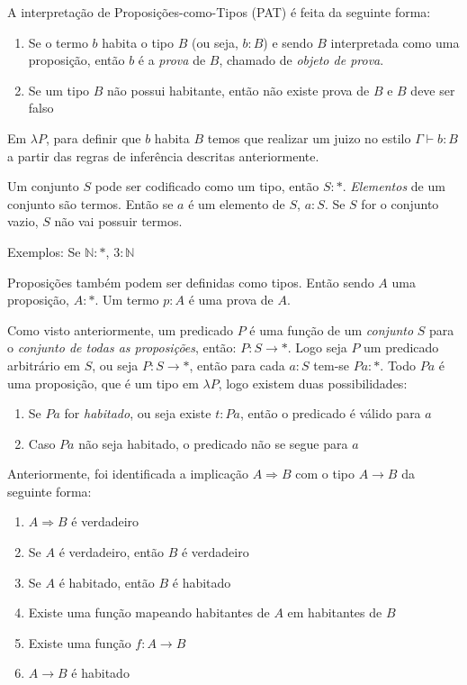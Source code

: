 \documentclass[../main.tex]{subfiles}
\begin{document}
A interpretação de Proposições-como-Tipos (PAT) é feita da seguinte forma:

\begin{enumerate}[label=-]
    \item Se o termo $b$ habita o tipo $B$ (ou seja, $b : B$) e sendo $B$ interpretada como uma proposição, então $b$ é a \emph{prova} de $B$, chamado de \emph{objeto de prova}.
    \item Se um tipo $B$ não possui habitante, então não existe prova de $B$ e $B$ deve ser falso
\end{enumerate}

Em $\lambda P$, para definir que $b$ habita $B$ temos que realizar um juizo no estilo $\Gamma \vdash b : B$ a partir das regras de inferência descritas anteriormente.

Um conjunto $S$ pode ser codificado como um tipo, então $S : \ast$. \emph{Elementos} de um conjunto são termos. Então se $a$ é um elemento de $S$, $a : S$. Se $S$ for o conjunto vazio, $S$ não vai possuir termos.

Exemplos: Se $\mathbb{N} : \ast$, $3 : \mathbb{N}$

Proposições também podem ser definidas como tipos. Então sendo $A$ uma proposição, $A : \ast$. Um termo $p : A$ é uma prova de $A$.

Como visto anteriormente, um predicado $P$ é uma função de um \emph{conjunto} $S$ para o \emph{conjunto de todas as proposições}, então: $P : S \to \ast$. Logo seja $P$ um predicado arbitrário em $S$, ou seja $P : S \to \ast$, então para cada $a : S$ tem-se $Pa : \ast$. Todo $Pa$ é uma proposição, que é um tipo em $\lambda P$, logo existem duas possibilidades:

\begin{enumerate}
    \item Se $Pa$ for \emph{habitado}, ou seja existe $t : Pa$, então o predicado é válido para $a$
    \item Caso $Pa$ não seja habitado, o predicado não se segue para $a$
\end{enumerate}

Anteriormente, foi identificada a implicação $A \Rightarrow  B$ com o tipo $A \to B$ da seguinte forma:

\begin{enumerate}[label=]
    \item $A \Rightarrow B$ é verdadeiro
    \item Se $A$ é verdadeiro, então $B$ é verdadeiro
    \item Se $A$ é habitado, então $B$ é habitado
    \item Existe uma função mapeando habitantes de $A$ em habitantes de $B$
    \item Existe uma função $f : A \to B$
    \item $A \to B$ é habitado
\end{enumerate}
\end{document}
